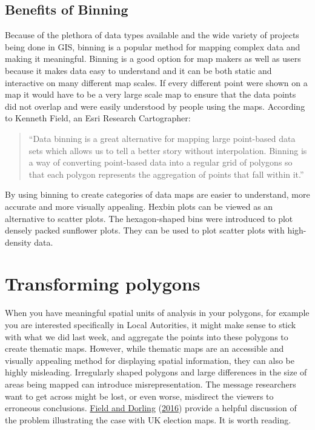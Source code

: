 \documentclass[
  krantz2]{krantz}
\begin{document}
\hypertarget{benefits-of-binning}{%
\subsection{Benefits of Binning}\label{benefits-of-binning}}

Because of the plethora of data types available and the wide variety of projects being done in GIS, binning is a popular method for mapping complex data and making it meaningful. Binning is a good option for map makers as well as users because it makes data easy to understand and it can be both static and interactive on many different map scales. If every different point were shown on a map it would have to be a very large scale map to ensure that the data points did not overlap and were easily understood by people using the maps. According to Kenneth Field, an Esri Research Cartographer:

\begin{quote}
``Data binning is a great alternative for mapping large point-based data sets which allows us to tell a better story without interpolation. Binning is a way of converting point-based data into a regular grid of polygons so that each polygon represents the aggregation of points that fall within it.''
\end{quote}

By using binning to create categories of data maps are easier to understand, more accurate and more visually appealing. Hexbin plots can be viewed as an alternative to scatter plots. The hexagon-shaped bins were introduced to plot densely packed sunflower plots. They can be used to plot scatter plots with high-density data.

\hypertarget{transforming-polygons}{%
\section{Transforming polygons}\label{transforming-polygons}}

When you have meaningful spatial units of analysis in your polygons, for example you are interested specifically in Local Autorities, it might make sense to stick with what we did last week, and aggregate the points into these polygons to create thematic maps. However, while thematic maps are an accessible and visually appealing method for displaying spatial information, they can also be highly misleading. Irregularly shaped polygons and large differences in the size of areas being mapped can introduce misrepresentation. The message researchers want to get across might be lost, or even worse, misdirect the viewers to erroneous conclusions. \protect\hyperlink{ref-Field_2016}{Field and Dorling} (\protect\hyperlink{ref-Field_2016}{2016}) provide a helpful discussion of the problem illustrating the case with UK election maps. It is worth reading.
\end{document}
